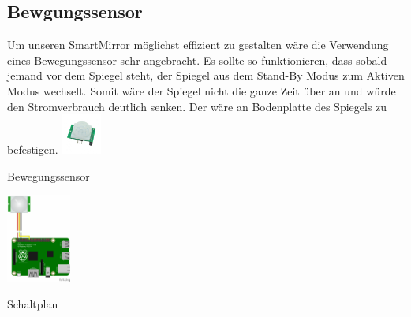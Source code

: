 \subsection{Bewgungssensor}
Um unseren SmartMirror möglichst effizient zu gestalten wäre die Verwendung eines Bewegungssensor sehr angebracht. Es sollte so funktionieren, dass sobald jemand vor dem Spiegel steht, der Spiegel aus dem Stand-By Modus zum Aktiven Modus wechselt. Somit wäre der Spiegel nicht die ganze Zeit über an und würde den Stromverbrauch deutlich senken. Der wäre an Bodenplatte des Spiegels zu befestigen. 
\includegraphics[width=50]{pictures/Bewegungssensor.jpg}
\caption{Bewegungssensor}
\includegraphics[width=80]{pictures/Bewegungssensor_Plan.png}
\caption{Schaltplan}

